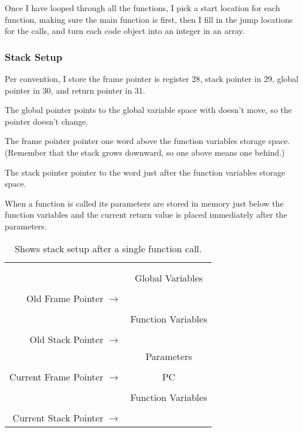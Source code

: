 Once I have looped through all the functions, I pick a start location for each function, making sure the main function is first, then I fill in the jump locations for the calls, and turn each code object into an integer in an array. 

\subsubsection*{Stack Setup}

Per convention, I store the frame pointer is register 28, stack pointer in 29, global pointer in 30, and return pointer in 31. 

The global pointer points to the global variable space with doesn't move, so the pointer doesn't change. 

The frame pointer pointer one word above the function variables storage space. (Remember that the stack grows downward, so one above means one behind.)

The stack pointer pointer to the word just after the function variables storage space. 

When a function is called its parameters are stored in memory just below the function variables and the current return value is placed immediately after the parameters. 

\captionsetup[table]{name=Figure}
\begin{table}[h!]
\centering
\begin{tabular}{r|c|}
 \cline{2-2}
 & \\
 & \\
 & Global Variables \\
 & \\
Old Frame Pointer $\rightarrow$ & \\
 \cline{2-2}
 & \\
 & Function Variables\\
 & \\
 \cline{2-2}
Old Stack Pointer $\rightarrow$ & \\
 & Parameters\\
 & \\
 \cline{2-2}
Current Frame Pointer $\rightarrow$ & PC\\
 \cline{2-2}
 & \\
 & Function Variables\\
 & \\
 \cline{2-2}
Current Stack Pointer $\rightarrow$ & \\
 \cline{2-2}
\end{tabular}
\caption{Shows stack setup after a single function call.}
\end{table}

